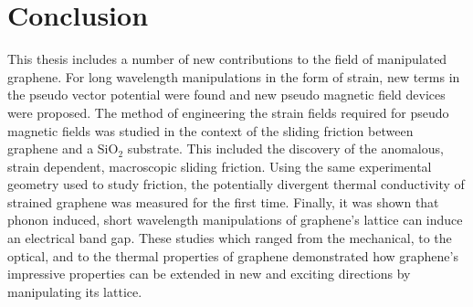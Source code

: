 \chapter{Conclusion}
This thesis includes a number of new contributions to the field of manipulated grap\-hene.
For long wavelength manipulations in the form of strain, new terms in the pseudo vector potential were found and new pseudo magnetic field devices were proposed.
The method of engineering the strain fields required for pseudo magnetic fields was studied in the context of the sliding friction between graphene and a SiO$_2$ substrate.
This included the discovery of the anomalous, strain dependent, macroscopic sliding friction.
Using the same experimental geometry used to study friction, the potentially divergent thermal conductivity of strained graphene was measured for the first time.
Finally, it was shown that phonon induced, short wavelength manipulations of graphene's lattice can induce an electrical band gap.
These studies which ranged from the mechanical, to the optical, and to the thermal properties of graphene demonstrated how graphene's impressive properties can be extended in new and exciting directions by manipulating its lattice.